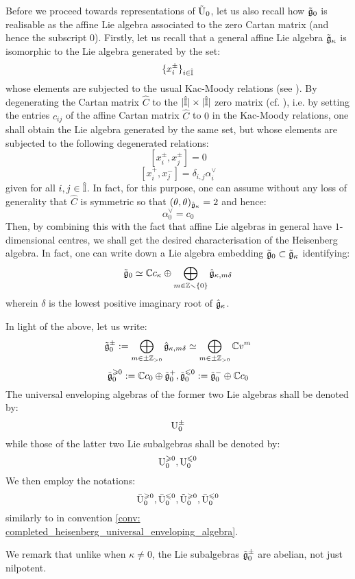             Before we proceed towards representations of $\tilde{\mathrm{U}}_0$, let us also recall how $\tilde{\mathfrak{g}}_0$ is realisable as the affine Lie algebra associated to the zero Cartan matrix (and hence the subscript $0$). Firstly, let us recall that a general affine Lie algebra $\tilde{\mathfrak{g}}_{\kappa}$ is isomorphic to the Lie algebra generated by the set:
                $$\{x_i^{\pm}\}_{i \in \hat{\mathbb{I}}}$$
            whose elements are subjected to the usual Kac-Moody relations (see \cite[Chapter 1]{kac_infinite_dimensional_lie_algebras}). By degenerating the Cartan matrix $\hat{C}$ to the $|\hat{\simpleroots}| \x |\hat{\simpleroots}|$ zero matrix (cf. \cite[Section 2.9]{kac_infinite_dimensional_lie_algebras}), i.e. by setting the entries $c_{ij}$ of the affine Cartan matrix $\hat{C}$ to $0$ in the Kac-Moody relations, one shall obtain the Lie algebra generated by the same set, but whose elements are subjected to the following degenerated relations:
                $$[x_i^{\pm}, x_j^{\pm}] = 0$$
                $$[x_i^+, x_j^-] = \delta_{i, j} \alpha_i^{\vee}$$
            given for all $i, j \in \hat{\mathbb{I}}$. In fact, for this purpose, one can assume without any loss of generality that $\hat{C}$ is symmetric so that $(\theta, \theta)_{\hat{\mathfrak{g}}_{\kappa}} = 2$ and hence:
                $$\alpha_0^{\vee} = c_0$$
            Then, by combining this with the fact that affine Lie algebras in general have $1$-dimensional centres, we shall get the desired characterisation of the Heisenberg algebra. In fact, one can write down a Lie algebra embedding $\tilde{\mathfrak{g}}_0 \subset \tilde{\mathfrak{g}}_{\kappa}$ identifying:
                $$\tilde{\mathfrak{g}}_0 \simeq \mathbb{C} c_{\kappa} \oplus \bigoplus_{m \in \mathbb{Z} \smallsetminus \{0\}} \hat{\mathfrak{g}}_{\kappa, m\delta}$$
            wherein $\delta$ is the lowest positive imaginary root of $\hat{\mathfrak{g}}_{\kappa}$.
            \begin{convention}
                In light of the above, let us write:
                    $$\tilde{\mathfrak{g}}_0^{\pm} := \bigoplus_{m \in \pm \mathbb{Z}_{> 0}} \hat{\mathfrak{g}}_{\kappa, m\delta} \simeq \bigoplus_{m \in \pm \mathbb{Z}_{> 0}} \mathbb{C} v^m$$
                    $$\tilde{\mathfrak{g}}_0^{\geqslant 0} := \mathbb{C} c_0 \oplus \tilde{\mathfrak{g}}_0^+, \tilde{\mathfrak{g}}_0^{\leqslant 0} := \tilde{\mathfrak{g}}_0^- \oplus \mathbb{C} c_0$$
                The universal enveloping algebras of the former two Lie algebras shall be denoted by:
                    $$\mathrm{U}_0^{\pm}$$
                while those of the latter two Lie subalgebras shall be denoted by:
                    $$\mathrm{U}_0^{\geqslant 0}, \mathrm{U}_0^{\leqslant 0}$$
                We then employ the notations:
                    $$\bar{\mathrm{U}}_0^{\geqslant 0}, \bar{\mathrm{U}}_0^{\leqslant 0}, \tilde{\mathrm{U}}_0^{\geqslant 0}, \bar{\mathrm{U}}_0^{\leqslant 0}$$
                similarly to in convention \ref{conv: completed_heisenberg_universal_enveloping_algebra}.
            \end{convention}
            We remark that unlike when $\kappa \not = 0$, the Lie subalgebras $\tilde{\mathfrak{g}}_0^{\pm}$ are abelian, not just nilpotent.

